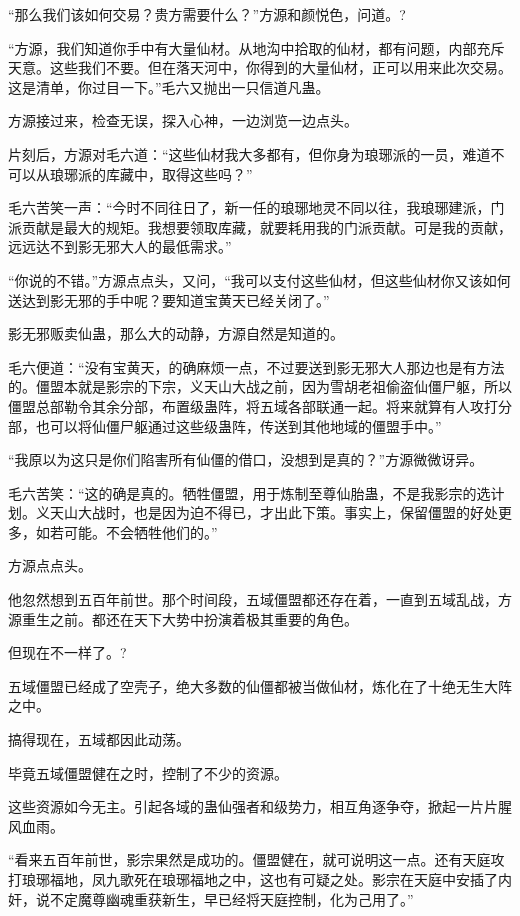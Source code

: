 
\begin{this_body}

“那么我们该如何交易？贵方需要什么？”方源和颜悦色，问道。?

“方源，我们知道你手中有大量仙材。从地沟中拾取的仙材，都有问题，内部充斥天意。这些我们不要。但在落天河中，你得到的大量仙材，正可以用来此次交易。这是清单，你过目一下。”毛六又抛出一只信道凡蛊。

方源接过来，检查无误，探入心神，一边浏览一边点头。

片刻后，方源对毛六道：“这些仙材我大多都有，但你身为琅琊派的一员，难道不可以从琅琊派的库藏中，取得这些吗？”

毛六苦笑一声：“今时不同往日了，新一任的琅琊地灵不同以往，我琅琊建派，门派贡献是最大的规矩。我想要领取库藏，就要耗用我的门派贡献。可是我的贡献，远远达不到影无邪大人的最低需求。”

“你说的不错。”方源点点头，又问，“我可以支付这些仙材，但这些仙材你又该如何送达到影无邪的手中呢？要知道宝黄天已经关闭了。”

影无邪贩卖仙蛊，那么大的动静，方源自然是知道的。

毛六便道：“没有宝黄天，的确麻烦一点，不过要送到影无邪大人那边也是有方法的。僵盟本就是影宗的下宗，义天山大战之前，因为雪胡老祖偷盗仙僵尸躯，所以僵盟总部勒令其余分部，布置级蛊阵，将五域各部联通一起。将来就算有人攻打分部，也可以将仙僵尸躯通过这些级蛊阵，传送到其他地域的僵盟手中。”

“我原以为这只是你们陷害所有仙僵的借口，没想到是真的？”方源微微讶异。

毛六苦笑：“这的确是真的。牺牲僵盟，用于炼制至尊仙胎蛊，不是我影宗的选计划。义天山大战时，也是因为迫不得已，才出此下策。事实上，保留僵盟的好处更多，如若可能。不会牺牲他们的。”

方源点点头。

他忽然想到五百年前世。那个时间段，五域僵盟都还存在着，一直到五域乱战，方源重生之前。都还在天下大势中扮演着极其重要的角色。

但现在不一样了。?

五域僵盟已经成了空壳子，绝大多数的仙僵都被当做仙材，炼化在了十绝无生大阵之中。

搞得现在，五域都因此动荡。

毕竟五域僵盟健在之时，控制了不少的资源。

这些资源如今无主。引起各域的蛊仙强者和级势力，相互角逐争夺，掀起一片片腥风血雨。

“看来五百年前世，影宗果然是成功的。僵盟健在，就可说明这一点。还有天庭攻打琅琊福地，凤九歌死在琅琊福地之中，这也有可疑之处。影宗在天庭中安插了内奸，说不定魔尊幽魂重获新生，早已经将天庭控制，化为己用了。”


\end{this_body}
